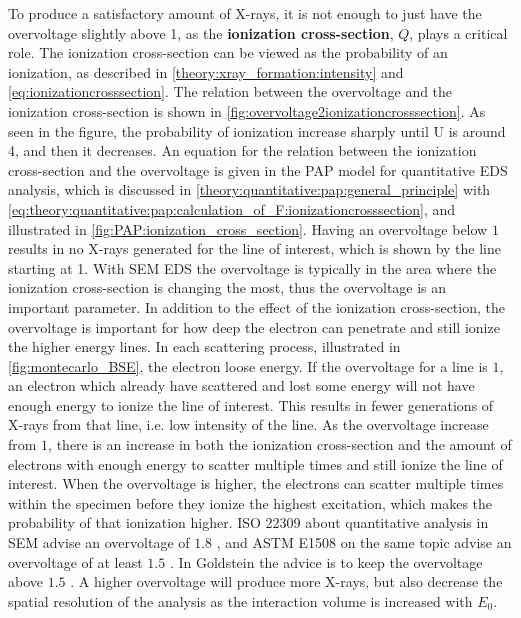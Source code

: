 To produce a satisfactory amount of X-rays, it is not enough to just have the overvoltage slightly above 1, as the \textbf{ionization cross-section}, $Q$, plays a critical role.
The ionization cross-section can be viewed as the probability of an ionization, as described in \cref{theory:xray_formation:intensity} and \cref{eq:ionizationcrosssection}.
The relation between the overvoltage and the ionization cross-section is shown in \cref{fig:overvoltage2ionizationcrosssection}.
As seen in the figure, the probability of ionization increase sharply until U is around 4, and then it decreases.
An equation for the relation between the ionization cross-section and the overvoltage is given in the PAP model for quantitative EDS analysis, which is discussed in \cref{theory:quantitative:pap:general_principle} with \cref{eq:theory:quantitative:pap:calculation_of_F:ionizationcrosssection}, and illustrated in \cref{fig:PAP:ionization_cross_section}.
Having an overvoltage below $1$ results in no X-rays generated for the line of interest, which is shown by the line starting at 1.
With SEM EDS the overvoltage is typically in the area where the ionization cross-section is changing the most, thus the overvoltage is an important parameter.
In addition to the effect of the ionization cross-section, the overvoltage is important for how deep the electron can penetrate and still ionize the higher energy lines.
In each scattering process, illustrated in \cref{fig:montecarlo_BSE}, the electron loose energy.
If the overvoltage for a line is $1$, an electron which already have scattered and lost some energy will not have enough energy to ionize the line of interest.
This results in fewer generations of X-rays from that line, i.e. low intensity of the line.
As the overvoltage increase from $1$, there is an increase in both the ionization cross-section and the amount of electrons with enough energy to scatter multiple times and still ionize the line of interest.
When the overvoltage is higher, the electrons can scatter multiple times within the specimen before they ionize the highest excitation, which makes the probability of that ionization higher.
ISO 22309 about quantitative analysis in SEM advise an overvoltage of $1.8$ \cite{iso_emsa_22029}, and ASTM E1508 on the same topic advise an overvoltage of at least $1.5$ \cite{astm_e1508_eds_quantification}.
In Goldstein the advice is to keep the overvoltage above $1.5$ \cite[Ch. 20.2.2]{goldstein_scanning_2018}.
A higher overvoltage will produce more X-rays, but also decrease the spatial resolution of the analysis as the interaction volume is increased with $E_0$. %


